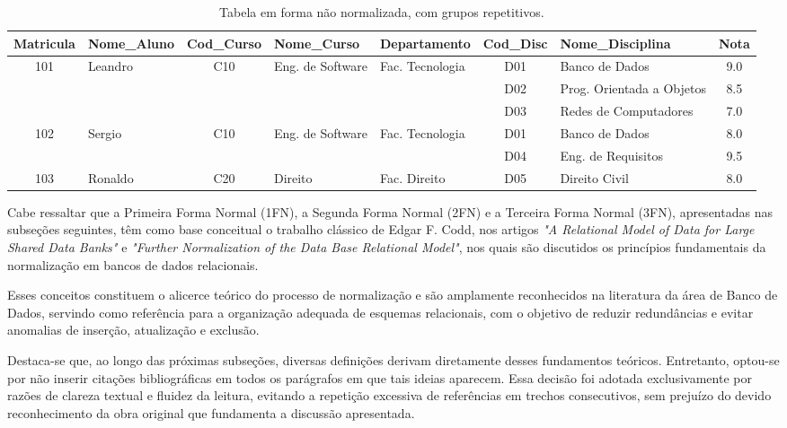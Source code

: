 \begin{table}[h!]
    \centering
    \renewcommand{\arraystretch}{1.2}

    \begin{adjustbox}{max width=\textwidth}
        \begin{tabular}{|c|l|c|l|l|c|l|c|}
            \hline
            \textbf{Matricula} & \textbf{Nome\_Aluno} & \textbf{Cod\_Curso} & \textbf{Nome\_Curso} & \textbf{Departamento} & \textbf{Cod\_Disc} & \textbf{Nome\_Disciplina} & \textbf{Nota} \\ \hline
            101 & Leandro & C10 & Eng. de Software & Fac. Tecnologia & D01 & Banco de Dados & 9.0 \\ 
            ~ & ~ & ~ & ~ & ~ & D02 & Prog. Orientada a Objetos & 8.5 \\ 
            ~ & ~ & ~ & ~ & ~ & D03 & Redes de Computadores & 7.0 \\ \hline
            102 & Sergio & C10 & Eng. de Software & Fac. Tecnologia & D01 & Banco de Dados & 8.0 \\ 
            ~ & ~ & ~ & ~ & ~ & D04 & Eng. de Requisitos & 9.5 \\ \hline
            103 & Ronaldo & C20 & Direito & Fac. Direito & D05 & Direito Civil & 8.0 \\ \hline
        \end{tabular}
\end{adjustbox}
    \caption{Tabela em forma não normalizada, com grupos repetitivos.}
    \label{tab:fnn}
\end{table}

Cabe ressaltar que a Primeira Forma Normal (1FN), a Segunda Forma Normal (2FN) e a Terceira Forma Normal (3FN), apresentadas nas subseções seguintes, têm como base conceitual o trabalho clássico de Edgar F. Codd, nos artigos \textit{"A Relational Model of Data for Large Shared Data Banks"} e \textit{"Further Normalization of the Data Base Relational Model"}, nos quais são discutidos os princípios fundamentais da normalização em bancos de dados relacionais.\cite{codd1970relational,codd1971normalization}

Esses conceitos constituem o alicerce teórico do processo de normalização e são amplamente reconhecidos na literatura da área de Banco de Dados, servindo como referência para a organização adequada de esquemas relacionais, com o objetivo de reduzir redundâncias e evitar anomalias de inserção, atualização e exclusão.

Destaca-se que, ao longo das próximas subseções, diversas definições derivam diretamente desses fundamentos teóricos. Entretanto, optou-se por não inserir citações bibliográficas em todos os parágrafos em que tais ideias aparecem. Essa decisão foi adotada exclusivamente por razões de clareza textual e fluidez da leitura, evitando a repetição excessiva de referências em trechos consecutivos, sem prejuízo do devido reconhecimento da obra original que fundamenta a discussão apresentada.

